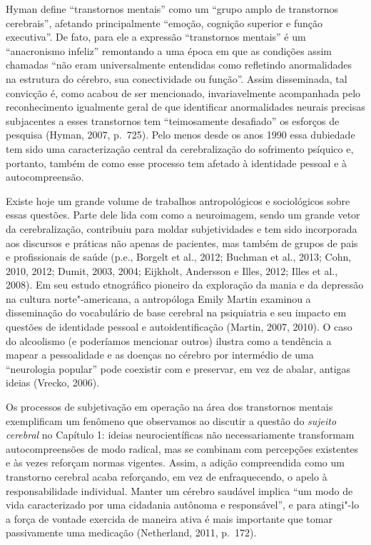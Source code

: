 Hyman define ``transtornos mentais'' como um ``grupo amplo de
transtornos cerebrais'', afetando principalmente ``emoção, cognição
superior e função executiva''. De fato, para ele a expressão
``transtornos mentais'' é um ``anacronismo infeliz'' remontando a uma
época em que as condições assim chamadas ``não eram universalmente
entendidas como refletindo anormalidades na estrutura do cérebro, sua
conectividade ou função''. Assim disseminada, tal convicção é, como
acabou de ser mencionado, invariavelmente acompanhada pelo
reconhecimento igualmente geral de que identificar anormalidades neurais
precisas subjacentes a esses transtornos tem ``teimosamente desafiado''
os esforços de pesquisa (Hyman, 2007, p.~725). Pelo menos desde os anos
1990 essa dubiedade tem sido uma caracterização central da
cerebralização do sofrimento psíquico e, portanto, também de como esse
processo tem afetado à identidade pessoal e à autocompreensão.

Existe hoje um grande volume de trabalhos antropológicos e sociológicos
sobre essas questões. Parte dele lida com como a neuroimagem, sendo um
grande vetor da cerebralização, contribuiu para moldar subjetividades e
tem sido incorporada aos discursos e práticas não apenas de pacientes,
mas também de grupos de pais e profissionais de saúde (p.e., Borgelt et
al., 2012; Buchman et al., 2013; Cohn, 2010, 2012; Dumit, 2003, 2004;
Eijkholt, Andersson e Illes, 2012; Illes et al., 2008). Em seu estudo
etnográfico pioneiro da exploração da mania e da depressão na cultura
norte"-americana, a antropóloga Emily Martin examinou a disseminação do
vocabulário de base cerebral na psiquiatria e seu impacto em questões de
identidade pessoal e autoidentificação (Martin, 2007, 2010). O caso do
alcoolismo (e poderíamos mencionar outros) ilustra como a tendência a
mapear a pessoalidade e as doenças no cérebro por intermédio de uma
``neurologia popular'' pode coexistir com e preservar, em vez de abalar,
antigas ideias (Vrecko, 2006).

Os processos de subjetivação em operação na área dos transtornos mentais
exemplificam um fenômeno que observamos ao discutir a questão do
\emph{sujeito cerebral} no Capítulo 1: ideias neurocientíficas não
necessariamente transformam autocompreensões de modo radical, mas se
combinam com percepções existentes e às vezes reforçam normas vigentes.
Assim, a adição compreendida como um transtorno cerebral acaba
reforçando, em vez de enfraquecendo, o apelo à responsabilidade
individual. Manter um cérebro saudável implica ``um modo de vida
caracterizado por uma cidadania autônoma e responsável'', e para
atingi"-lo a força de vontade exercida de maneira ativa é mais importante
que tomar passivamente uma medicação (Netherland, 2011, p.~172).

